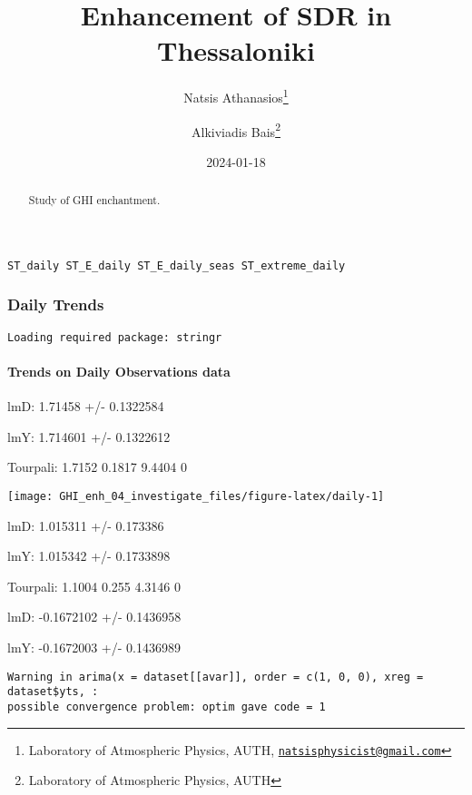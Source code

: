 \documentclass[
  10pt,
  a4paper,oneside]{article}
\title{Enhancement of SDR in Thessaloniki}
\author{Natsis Athanasios\footnote{Laboratory of Atmospheric Physics, AUTH, \href{mailto:natsisphysicist@gmail.com}{\nolinkurl{natsisphysicist@gmail.com}}} \and Alkiviadis Bais\footnote{Laboratory of Atmospheric Physics, AUTH}}
\date{2024-01-18}
\begin{document}
\maketitle
\begin{abstract}
Study of GHI enchantment.
\end{abstract}

{
\hypersetup{linkcolor=}
\setcounter{tocdepth}{4}
\tableofcontents
}
\begin{verbatim}
ST_daily ST_E_daily ST_E_daily_seas ST_extreme_daily
\end{verbatim}

\newpage
\FloatBarrier

\hypertarget{daily-trends}{%
\subsubsection{Daily Trends}\label{daily-trends}}

\newpage

\begin{verbatim}
Loading required package: stringr
\end{verbatim}

\hypertarget{trends-on-daily-observations-data}{%
\paragraph{Trends on Daily Observations data}\label{trends-on-daily-observations-data}}

lmD: 1.71458 +/- 0.1322584

lmY: 1.714601 +/- 0.1322612

Tourpali: 1.7152 0.1817 9.4404 0

\begin{center}\texttt{[image: GHI\_enh\_04\_investigate\_files/figure-latex/daily-1]} \end{center}

lmD: 1.015311 +/- 0.173386

lmY: 1.015342 +/- 0.1733898

Tourpali: 1.1004 0.255 4.3146 0

lmD: -0.1672102 +/- 0.1436958

lmY: -0.1672003 +/- 0.1436989

\begin{verbatim}
Warning in arima(x = dataset[[avar]], order = c(1, 0, 0), xreg = dataset$yts, :
possible convergence problem: optim gave code = 1
\end{verbatim}
\end{document}
